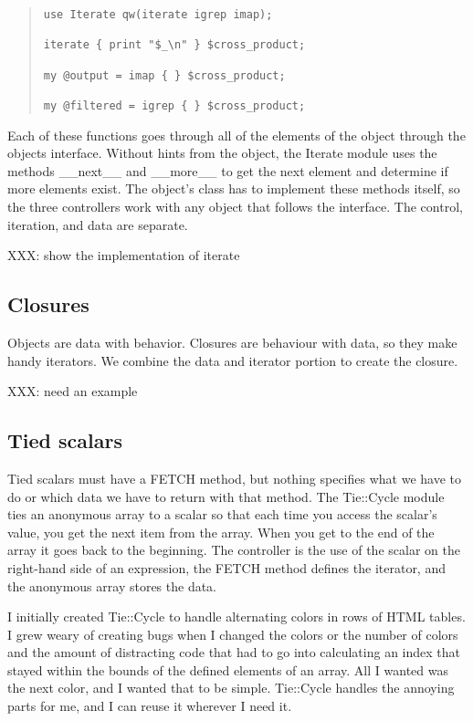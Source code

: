 \begin{quote}
\begin{verbatim}
use Iterate qw(iterate igrep imap);

iterate { print "$_\n" } $cross_product;

my @output = imap { } $cross_product;

my @filtered = igrep { } $cross_product;
\end{verbatim}
\end{quote}
    
Each of these functions goes through all of the elements of the
object through the objects interface.  Without hints from the
object, the Iterate module uses the methods __next__ and __more__
to get the next element and determine if more elements exist.  The
object's class has to implement these methods itself, so the three
controllers work with any object that follows the interface.  The
control, iteration, and data are separate.

XXX: show the implementation of iterate

    \subsection{Closures}

Objects are data with behavior.  Closures are behaviour with data, so 
they make handy iterators.  We combine the data and iterator portion
to create the closure.

XXX: need an example

    \subsection{Tied scalars}

Tied scalars must have a FETCH method, but nothing specifies what
we have to do or which data we have to return with that method.  The
Tie::Cycle module ties an anonymous array to a scalar so that each
time you access the scalar's value, you get the next item from the 
array.  When you get to the end of the array it goes back to the
beginning.  The controller is the use of the scalar on the right-hand
side of an expression, the FETCH method defines the iterator, and the
anonymous array stores the data.

I initially created Tie::Cycle to handle alternating colors in rows
of HTML tables.  I grew weary of creating bugs when I changed the
colors or the number of colors and the amount of distracting code
that had to go into calculating an index that stayed within the
bounds of the defined elements of an array.  All I wanted was the
next color, and I wanted that to be simple.  Tie::Cycle handles
the annoying parts for me, and I can reuse it wherever I need it.

